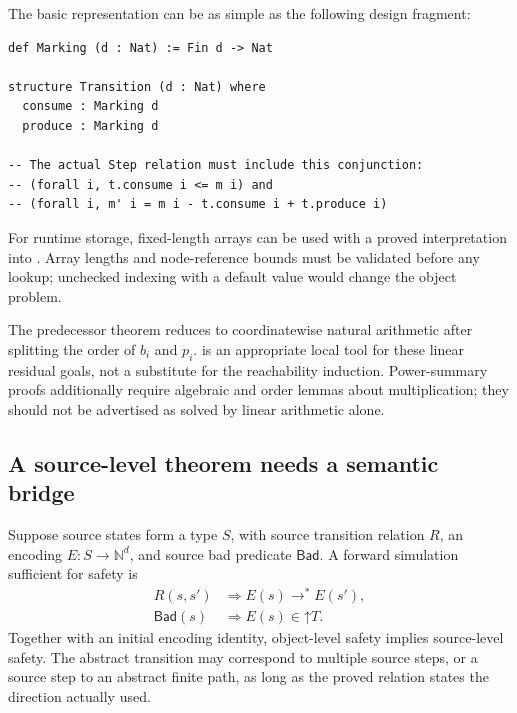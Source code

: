 \documentclass[11pt,a4paper]{article}
\newcommand{\N}{\mathbb N}
\newcommand{\Up}[1]{\mathord{\uparrow}#1}
\newcommand{\code}[1]{\texttt{\detokenize{#1}}}
\theoremstyle{definition}
\theoremstyle{remark}
\begin{document}
The basic representation can be as simple as the following design fragment:
\par\noindent\begin{minipage}{\linewidth}
\begin{lstlisting}
def Marking (d : Nat) := Fin d -> Nat

structure Transition (d : Nat) where
  consume : Marking d
  produce : Marking d

-- The actual Step relation must include this conjunction:
-- (forall i, t.consume i <= m i) and
-- (forall i, m' i = m i - t.consume i + t.produce i)
\end{lstlisting}
\end{minipage}\par
For runtime storage, fixed-length arrays can be used with a proved interpretation into \code{Fin d -> Nat}. Array lengths and node-reference bounds must be validated before any lookup; unchecked indexing with a default value would change the object problem.

The predecessor theorem reduces to coordinatewise natural arithmetic after splitting the order of $b_i$ and $p_i$. \code{omega} is an appropriate local tool for these linear residual goals, not a substitute for the reachability induction. Power-summary proofs additionally require algebraic and order lemmas about multiplication; they should not be advertised as solved by linear arithmetic alone.

\subsection{A source-level theorem needs a semantic bridge}\label{sec:bridge}
Suppose source states form a type $S$, with source transition relation $R$, an encoding $E:S\to\N^d$, and source bad predicate $\mathsf{Bad}$. A forward simulation sufficient for safety is
\begin{align}
 R(s,s')&\Longrightarrow E(s)\to^*E(s'),\label{eq:forwardbridge}\\
 \mathsf{Bad}(s)&\Longrightarrow E(s)\in\Up{T}.\label{eq:badbridge}
\end{align}
Together with an initial encoding identity, object-level safety implies source-level safety. The abstract transition may correspond to multiple source steps, or a source step to an abstract finite path, as long as the proved relation states the direction actually used.
\end{document}
